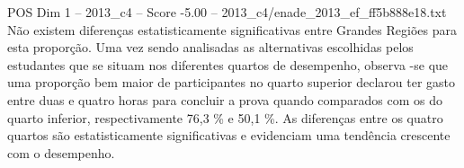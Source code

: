 \begin{textsample}{POS Dim 1 – 2013\_c4 – Score -5.00 – 2013\_c4/enade\_2013\_ef\_ff5b888e18.txt}
Não existem diferenças estatisticamente significativas entre Grandes Regiões para esta proporção.
Uma vez sendo analisadas as alternativas escolhidas pelos estudantes que se situam nos diferentes quartos de desempenho, observa -se que uma proporção bem maior de participantes no quarto superior declarou ter gasto entre duas e quatro horas para concluir a prova quando comparados com os do quarto inferior, respectivamente 76,3 \% e 50,1 \%.
As diferenças entre os quatro quartos são estatisticamente significativas e evidenciam uma tendência crescente com o desempenho.

\end{textsample}
